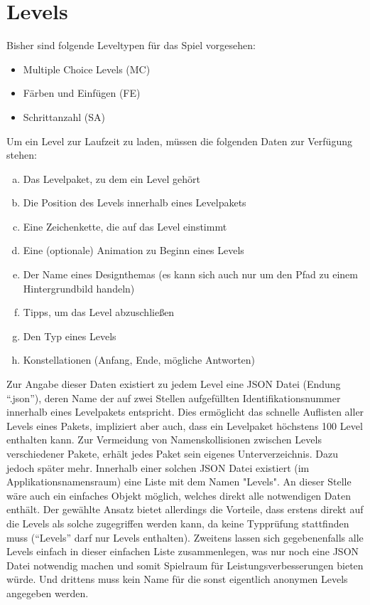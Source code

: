 \section{Levels}
Bisher sind folgende Leveltypen für das Spiel vorgesehen:
\begin{itemize}
	\item Multiple Choice Levels (MC)
	\item Färben und Einfügen (FE)
	\item Schrittanzahl (SA)
\end{itemize}
Um ein Level zur Laufzeit zu laden, müssen die folgenden Daten zur Verfügung stehen:
\begin{enumerate}[a)]
	\item Das Levelpaket, zu dem ein Level gehört
	\item Die Position des Levels innerhalb eines Levelpakets
	\item Eine Zeichenkette, die auf das Level einstimmt
	\item Eine (optionale) Animation zu Beginn eines Levels
	\item Der Name eines Designthemas (es kann sich auch nur um den Pfad zu einem Hintergrundbild handeln)
	\item Tipps, um das Level abzuschließen
	\item Den Typ eines Levels
	\item Konstellationen (Anfang, Ende, mögliche Antworten)
\end{enumerate}
Zur Angabe dieser Daten existiert zu jedem Level eine JSON Datei (Endung "`.json"'), deren Name der auf zwei Stellen aufgefüllten Identifikationsnummer innerhalb eines Levelpakets entspricht.
Dies ermöglicht das schnelle Auflisten aller Levels eines Pakets, impliziert aber auch, dass ein Levelpaket höchstens 100 Level enthalten kann.
Zur Vermeidung von Namenskollisionen zwischen Levels verschiedener Pakete, erhält jedes Paket sein eigenes Unterverzeichnis.
Dazu jedoch später mehr.
Innerhalb einer solchen JSON Datei existiert (im Applikationsnamensraum) eine Liste mit dem Namen "Levels".
An dieser Stelle wäre auch ein einfaches Objekt möglich, welches direkt alle notwendigen Daten enthält.
Der gewählte Ansatz bietet allerdings die Vorteile, dass erstens direkt auf die Levels als solche zugegriffen werden kann, da keine Typprüfung stattfinden muss ("`Levels"' darf nur Levels enthalten).
Zweitens lassen sich gegebenenfalls alle Levels einfach in dieser einfachen Liste zusammenlegen, was nur noch eine JSON Datei notwendig machen und somit Spielraum für Leistungsverbesserungen bieten würde.
Und drittens muss kein Name für die sonst eigentlich anonymen Levels angegeben werden.


